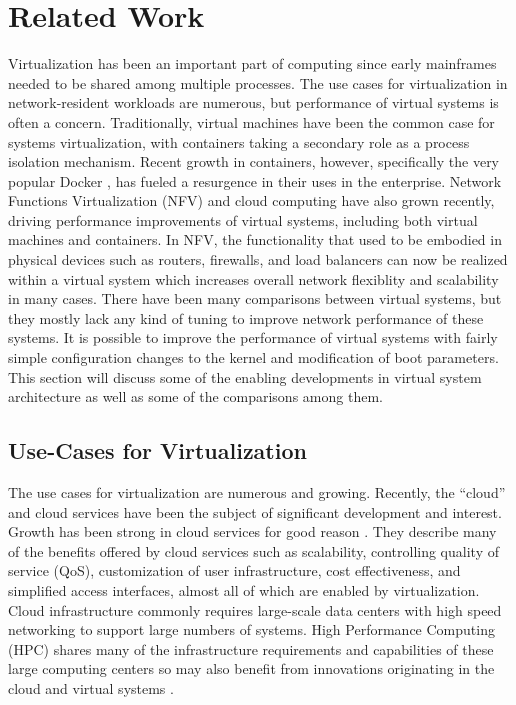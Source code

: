 \chapter{Related Work}
\label{cha:related_work}
\label{sec:related_work}
Virtualization has been an important part of computing since early mainframes needed to be shared among multiple processes.
The use cases for virtualization in network-resident workloads are numerous, but performance of virtual systems is often a concern.
Traditionally, virtual machines have been the common case for systems virtualization, with containers taking a secondary role as a process isolation mechanism.
Recent growth in containers, however, specifically the very popular Docker \autocite{dockerdotcom}, has fueled a resurgence in their uses in the enterprise.
Network Functions Virtualization (NFV) and cloud computing have also grown recently, driving performance improvements of virtual systems, including both virtual machines and containers.
In NFV, the functionality that used to be embodied in physical devices such as routers, firewalls, and load balancers can now be realized within a virtual system which increases overall network flexiblity and scalability in many cases.
There have been many comparisons between virtual systems, but they mostly lack any kind of tuning to improve network performance of these systems.
It is possible to improve the performance of virtual systems with fairly simple configuration changes to the kernel and modification of boot parameters.
This section will discuss some of the enabling developments in virtual system architecture as well as some of the comparisons among them.  

\section{Use-Cases for Virtualization} %
\label{sec:usecasesvt}
The use cases for virtualization are numerous and growing. 
Recently, the ``cloud'' and cloud services have been the subject of significant development and interest.
Growth has been strong in cloud services for good reason \autocite{_younge_1}.
They describe many of the benefits offered by cloud services such as scalability, controlling quality of service (QoS), customization of user infrastructure, cost effectiveness, and simplified access interfaces, almost all of which are enabled by virtualization.  
Cloud infrastructure commonly requires large-scale data centers with high speed networking to support large numbers of systems.  
High Performance Computing (HPC) shares many of the infrastructure requirements and capabilities of these large computing centers so may also benefit from innovations originating in the cloud and virtual systems \autocite{xavier2013performance, _younge_1}.

